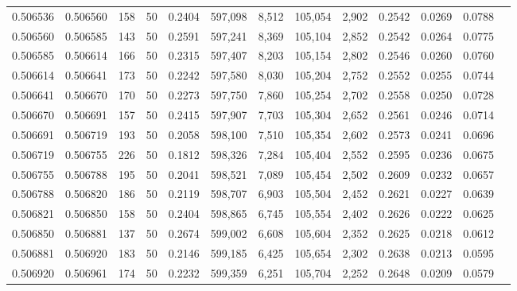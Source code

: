 \begin{tabular}{rrrrrrrrrrrrr}
0.506536 & 0.506560 & 158 &  50 &                                     0.2404 & 597,098 &   8,512 & 105,054 &   2,902 & 0.2542 & 0.0269 & 0.0788 \\
0.506560 & 0.506585 & 143 &  50 &                                     0.2591 & 597,241 &   8,369 & 105,104 &   2,852 & 0.2542 & 0.0264 & 0.0775 \\
0.506585 & 0.506614 & 166 &  50 &                                     0.2315 & 597,407 &   8,203 & 105,154 &   2,802 & 0.2546 & 0.0260 & 0.0760 \\
0.506614 & 0.506641 & 173 &  50 &                                     0.2242 & 597,580 &   8,030 & 105,204 &   2,752 & 0.2552 & 0.0255 & 0.0744 \\
0.506641 & 0.506670 & 170 &  50 &                                     0.2273 & 597,750 &   7,860 & 105,254 &   2,702 & 0.2558 & 0.0250 & 0.0728 \\
0.506670 & 0.506691 & 157 &  50 &                                     0.2415 & 597,907 &   7,703 & 105,304 &   2,652 & 0.2561 & 0.0246 & 0.0714 \\
0.506691 & 0.506719 & 193 &  50 &                                     0.2058 & 598,100 &   7,510 & 105,354 &   2,602 & 0.2573 & 0.0241 & 0.0696 \\
0.506719 & 0.506755 & 226 &  50 &                                     0.1812 & 598,326 &   7,284 & 105,404 &   2,552 & 0.2595 & 0.0236 & 0.0675 \\
0.506755 & 0.506788 & 195 &  50 &                                     0.2041 & 598,521 &   7,089 & 105,454 &   2,502 & 0.2609 & 0.0232 & 0.0657 \\
0.506788 & 0.506820 & 186 &  50 &                                     0.2119 & 598,707 &   6,903 & 105,504 &   2,452 & 0.2621 & 0.0227 & 0.0639 \\
0.506821 & 0.506850 & 158 &  50 &                                     0.2404 & 598,865 &   6,745 & 105,554 &   2,402 & 0.2626 & 0.0222 & 0.0625 \\
0.506850 & 0.506881 & 137 &  50 &                                     0.2674 & 599,002 &   6,608 & 105,604 &   2,352 & 0.2625 & 0.0218 & 0.0612 \\
0.506881 & 0.506920 & 183 &  50 &                                     0.2146 & 599,185 &   6,425 & 105,654 &   2,302 & 0.2638 & 0.0213 & 0.0595 \\
0.506920 & 0.506961 & 174 &  50 &                                     0.2232 & 599,359 &   6,251 & 105,704 &   2,252 & 0.2648 & 0.0209 & 0.0579 \\

\end{tabular}
